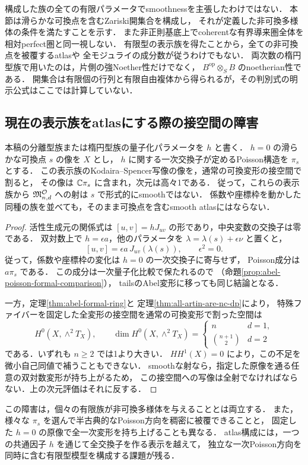 \begin{remark}[この開近傍定理の範囲]
構成した族の全ての有限パラメータでsmoothnessを主張したわけではない．
本節は滑らかな可換点を含むZariski開集合を構成し，
それが定義した非可換多様体の条件を満たすことを示す．
また非正則基底上でcoherentな有界導来圏全体を相対perfect圏と同一視しない．
有限型の表示族を得たことから，全ての非可換点を被覆するatlasや
全モジュライの成分数が従うわけでもない．
両次数の楕円型族で用いたのは，片側の強Noether性だけでなく，
$B^{\mathrm{op}}\otimes_S B$ のnoetherian性である．
開集合は有限個の行列と有限自由複体から得られるが，その判別式の明示公式はここでは計算していない．
\end{remark}

\subsection{現在の表示族をatlasにする際の接空間の障害}

\begin{proposition}[一つの量子化パラメータによる表示の限界]
\label{prop:one-parameter-atlas-obstruction}
本稿の分離型族または楕円型族の量子化パラメータを $h$ と書く．
$h=0$ の滑らかな可換点 $s$ の像を $X$ とし，
$h$ に関する一次交換子が定めるPoisson構造を $\pi_s$ とする．
この表示族のKodaira--Spencer写像の像を，通常の可換変形の接空間で割ると，
その像は $\mathbb C\pi_s$ に含まれ，次元は高々1である．
従って，これらの表示族から
$\mathfrak M^{\mathcal O}_{n,d}$ への射は $s$ で形式的にsmoothではない．
係数や座標枠を動かした同種の族を並べても，そのまま可換点を含むsmooth atlasにはならない．
\end{proposition}
\begin{proof}
活性生成元の関係式は $[u,v]=hJ_{uv}$ の形であり，中央変数の交換子は零である．
双対数上で $h=\epsilon a$，他のパラメータを
$\lambda=\lambda(s)+\epsilon\nu$ と置くと，
\[
 [u,v]=\epsilon a\,J_{uv}(\lambda(s)),\qquad \epsilon^2=0.
\]
従って，係数や座標枠の変化は $h=0$ の一次交換子に寄与せず，
Poisson成分は $a\pi_s$ である．
この成分は一次量子化比較で保たれるので
（命題\ref{prop:abel-poisson-formal-comparison}），
tailsのAbel変形に移っても同じ結論となる．

一方，定理\ref{thm:abel-formal-ring}と
定理\ref{thm:all-artin-are-nc-dp}により，
特殊ファイバーを固定した全変形の接空間を通常の可換変形で割った空間は
\[
 H^0(X,\wedge^2T_X),\qquad
 \dim H^0(X,\wedge^2T_X)
 =\begin{cases}
   n&d=1,\\
   \binom{n+1}{2}&d=2
  \end{cases}
\]
である．いずれも $n\ge2$ では1より大きい．
$HH^1(X)=0$ により，この不足を微小自己同値で補うこともできない．
smoothな射なら，指定した原像を通る任意の双対数変形が持ち上がるため，
この接空間への写像は全射でなければならない．上の次元評価はそれに反する．
\end{proof}

この障害は，個々の有限族が非可換多様体を与えることとは両立する．
また，様々な $\pi_s$ を選んで半古典的なPoisson方向を稠密に被覆できることと，
固定した $h=0$ の原像で全一次変形を持ち上げることも異なる．
atlas構成には，一つの共通因子 $h$ を通じて全交換子を作る表示を越えて，
独立な一次Poisson方向を同時に含む有限型模型を構成する課題が残る．


